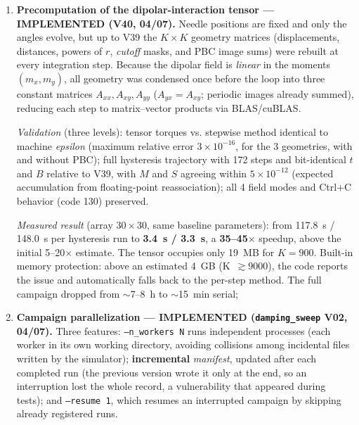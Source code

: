 \documentclass[11pt,a4paper]{article}
\newcommand{\code}[1]{\texttt{#1}}
\begin{document}
\begin{enumerate}
\item \textbf{Precomputation of the dipolar-interaction tensor --- IMPLEMENTED (V40, 04/07).} Needle positions are fixed and only the angles evolve, but up to V39 the $K \times K$ geometry matrices (displacements, distances, powers of $r$, \emph{cutoff} masks, and PBC image sums) were rebuilt at every integration step. Because the dipolar field is \emph{linear} in the moments $(m_x, m_y)$, all geometry was condensed once before the loop into three constant matrices $A_{xx}, A_{xy}, A_{yy}$ ($A_{yx} = A_{xy}$; periodic images already summed), reducing each step to matrix--vector products via BLAS/cuBLAS.

\emph{Validation} (three levels): tensor torques vs. stepwise method identical to machine \emph{epsilon} (maximum relative error $3 \times 10^{-16}$, for the 3 geometries, with and without PBC); full hysteresis trajectory with 172 steps and bit-identical $t$ and $B$ relative to V39, with $M$ and $S$ agreeing within $5 \times 10^{-12}$ (expected accumulation from floating-point reassociation); all 4 field modes and \mbox{Ctrl+C} behavior (code 130) preserved.

\emph{Measured result} (array $30\times30$, same baseline parameters): from 117.8~s / 148.0~s per hysteresis run to \textbf{3.4~s / 3.3~s}, a \textbf{35--45$\times$} speedup, above the initial 5--20$\times$ estimate. The tensor occupies only 19~MB for $K = 900$. Built-in memory protection: above an estimated 4~GB (K~$\gtrsim 9000$), the code reports the issue and automatically falls back to the per-step method. The full campaign dropped from $\sim$7--8~h to $\sim$15~min serial;
\item \textbf{Campaign parallelization --- IMPLEMENTED (\code{damping\_sweep} V02, 04/07).} Three features: \code{--n\_workers~N} runs independent processes (each worker in its own working directory, avoiding collisions among incidental files written by the simulator); \textbf{incremental} \emph{manifest}, updated after each completed run (the previous version wrote it only at the end, so an interruption lost the whole record, a vulnerability that appeared during tests); and \code{--resume~1}, which resumes an interrupted campaign by skipping already registered runs.


\end{enumerate}
\end{document}
